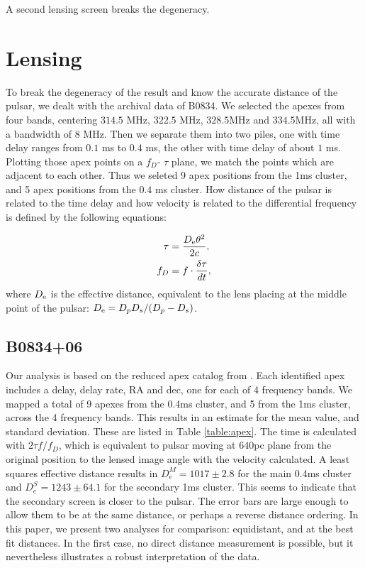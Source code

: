 \documentclass[useAMS,usenatbib]{mn2e}
\begin{document}
A second lensing screen breaks the degeneracy.

\section{Lensing}

To break the degeneracy of the result and know the accurate distance of the pulsar, we dealt with the archival data of B0834. We selected the apexes from four bands, centering $314.5$ MHz, $322.5$ MHz, $328.5$MHz and $334.5$MHz, all with a bandwidth of $8$ MHz. Then we separate them into two piles, one with time delay ranges from $0.1$ ms to $0.4$ ms, the other with time delay of about $1$ ms. Plotting those apex points on a $f_D$- $\tau$ plane, we match the points which are adjacent to each other. Thus we seleted 9 apex positions from the 1ms cluster, and 5 apex positions from the $0.4$ ms cluster. How distance of the pulsar is related to the time delay and how velocity is related to the differential frequency is defined by the following equations:

\begin{align*}
\tau &=\frac{D_{\rm e}{\theta}^2}{2c}, \\
f_D  &=f\cdot\frac{\delta\tau}{dt},
\end{align*} 
where ${D_{\rm e}}$ is the effective distance, equivalent to the lens placing at the middle point of the pulsar: $D_{\rm e}={D_p D_s}/({D_p - D_s})$. 

\subsection{B0834+06}

Our analysis is based on the reduced apex catalog from
\citet{2010ApJ...708..232B}. Each identified apex includes a delay,
delay rate, RA and dec, one for each of 4 frequency bands.  We mapped
a total of 9 apexes from the 0.4ms cluster, and 5 from the 1ms
cluster, across the 4 frequency bands.  This results in an estimate
for the mean value, and standard deviation.  These are listed in Table
\ref{table:apex}. The time is calculated with $2{\tau}f/{f_{D}}$,
which is equivalent to pulsar moving at $640$pc plane from the
original position to the lensed image angle with the velocity
calculated. A least squares effective distance results in
$D_e^M=1017\pm 2.8$ for the main 0.4ms cluster and
$D_e^S = 1243 \pm 64.1$ for the secondary 1ms cluster.  This seems to
indicate that the secondary screen is closer to the pulsar.  The error
bars are large enough to allow them to be at the same distance, or
perhaps a reverse distance ordering.  In this paper, we present two
analyses for comparison: equidistant, and at the best fit distances.
In the first case, no direct distance measurement is possible, but it
nevertheless illustrates a robust interpretation of the data.
\end{document}
